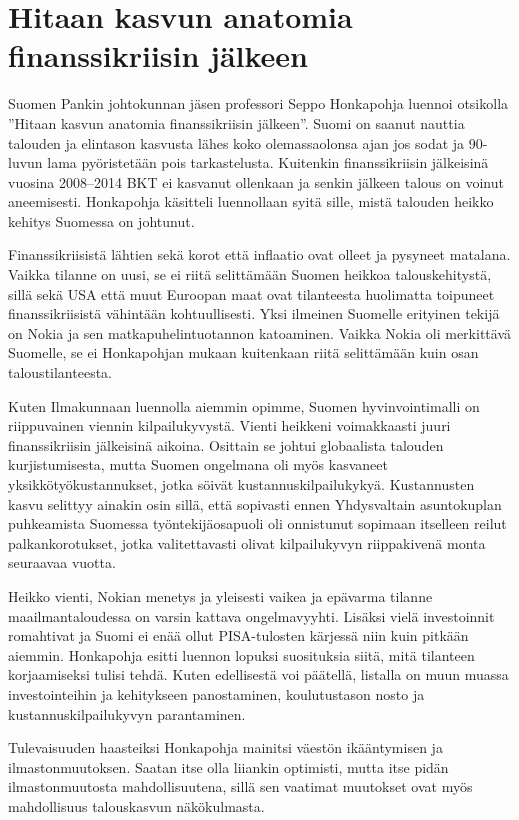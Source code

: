 \documentclass[12pt]{article}
\begin{document}
\newpage
\section{Hitaan kasvun anatomia finanssikriisin jäl\-keen}

Suomen Pankin johtokunnan jäsen professori Seppo Honkapohja luennoi otsikolla ''Hitaan kasvun anatomia finanssikriisin jälkeen''. Suomi on saanut nauttia talouden ja elintason kasvusta lähes koko olemassaolonsa ajan jos sodat ja 90-luvun lama pyöristetään pois tarkastelusta. Kuitenkin finanssikriisin jälkeisinä vuosina 2008--2014 BKT ei kasvanut ollenkaan ja senkin jälkeen talous on voinut aneemisesti. Honkapohja käsitteli luennollaan syitä sille, mistä talouden heikko kehitys Suomessa on johtunut.

Finanssikriisistä lähtien sekä korot että inflaatio ovat olleet ja pysyneet matalana. Vaikka tilanne on uusi, se ei riitä selittämään Suomen heikkoa talouskehitystä, sillä sekä USA että muut Euroopan maat ovat tilanteesta huolimatta toipuneet finanssikriisistä vähintään kohtuullisesti. Yksi ilmeinen Suomelle erityinen tekijä on Nokia ja sen matkapuhelintuotannon katoaminen. Vaikka Nokia oli merkittävä Suomelle, se ei Honkapohjan mukaan kuitenkaan riitä selittämään kuin osan taloustilanteesta.

Kuten Ilmakunnaan luennolla aiemmin opimme, Suomen hyvinvointimalli on riippuvainen viennin kilpailukyvystä. Vienti heikkeni voimakkaasti juuri finanssikriisin jälkeisinä aikoina. Osittain se johtui globaalista talouden kurjistumisesta, mutta Suomen ongelmana oli myös kasvaneet yksikkötyökustannukset, jotka söivät kustannuskilpailukykyä. Kustannusten kasvu selittyy ainakin osin sillä, että sopivasti ennen Yhdysvaltain asuntokuplan puhkeamista Suomessa työntekijäosapuoli oli onnistunut sopimaan itselleen reilut palkankorotukset, jotka valitettavasti olivat kilpailukyvyn riippakivenä monta seuraavaa vuotta.

Heikko vienti, Nokian menetys ja yleisesti vaikea ja epävarma tilanne maailmantaloudessa on varsin kattava ongelmavyyhti. Lisäksi vielä investoinnit romahtivat ja Suomi ei enää ollut PISA-tulosten kärjessä niin kuin pitkään aiemmin. Honkapohja esitti luennon lopuksi suosituksia siitä, mitä tilanteen korjaamiseksi tulisi tehdä. Kuten edellisestä voi päätellä, listalla on muun muassa investointeihin ja kehitykseen panostaminen, koulutustason nosto ja kustannuskilpailukyvyn parantaminen.

Tulevaisuuden haasteiksi Honkapohja mainitsi väestön ikääntymisen ja ilmastonmuutoksen. Saatan itse olla liiankin optimisti, mutta itse pidän ilmastonmuutosta mahdollisuutena, sillä sen vaatimat muutokset ovat myös mahdollisuus talouskasvun näkökulmasta.
\end{document}
